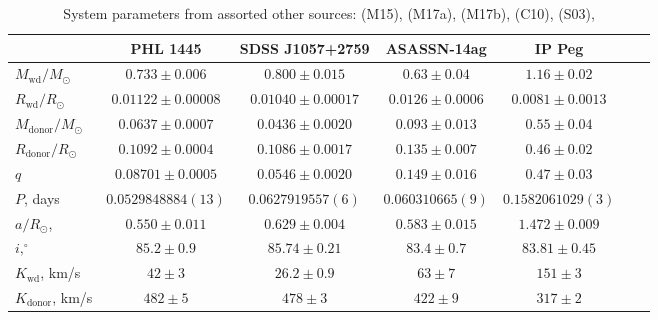 \begin{landscape}
        \begin{table*}
            \centering
            \centering
            \caption{System parameters from assorted other sources: \citet{mcallister2015} (M15), \citet{mcallister2017} (M17a), \citet{mcallister2017b} (M17b), \citet{copperwheat2010} (C10), \citet{shafter2003} (S03), }
            \label{appendix:table:supplementary systems}
            \begin{tabular}{lcccccc}
                \hline
                ~                           & \textbf{PHL 1445}         & \textbf{SDSS J1057+2759}  & \textbf{ASASSN-14ag}  & \textbf{IP Peg}       \\
                \hline \hline
                $M_\mathrm{wd}/M_\odot$     & $0.733\pm0.006$           & $0.800\pm0.015$           & $0.63\pm0.04$         & $1.16\pm0.02$         \\
                $R_\mathrm{wd}/R_\odot$     & $0.01122\pm0.00008$       & $0.01040\pm0.00017$       & $0.0126\pm0.0006$     & $0.0081\pm0.0013$     \\
                $M_\mathrm{donor}/M_\odot$  & $0.0637\pm0.0007$         & $0.0436\pm0.0020$         & $0.093\pm0.013$       & $0.55\pm0.04$         \\
                $R_\mathrm{donor}/R_\odot$  & $0.1092\pm0.0004$         & $0.1086\pm0.0017$         & $0.135\pm0.007$       & $0.46\pm0.02$         \\
                $q$                         & $0.08701\pm0.0005$        & $0.0546\pm0.0020$         & $0.149\pm0.016$       & $0.47\pm0.03$         \\
                \hline
                $P$, days                   & $0.0529848884(13)$        & $0.0627919557(6)$         & $0.060310665(9)$      & $0.1582061029(3)$     \\
                $a/R_\odot$,                & $0.550\pm0.011$           & $0.629\pm0.004$           & $0.583\pm0.015$       & $1.472\pm0.009$       \\
                $i, ^\circ$                 & $85.2\pm0.9$              & $85.74\pm0.21$            & $83.4\pm0.7$          & $83.81\pm0.45$        \\
                $K_\mathrm{wd}$, km/s       & $42\pm3$                  & $26.2\pm0.9$              & $63\pm7$              & $151\pm3$             \\
                $K_\mathrm{donor}$, km/s    & $482\pm5$                 & $478\pm3$                 & $422\pm9$             & $317\pm2$             \\

\end{tabular}
\end{table*}
\end{landscape}
